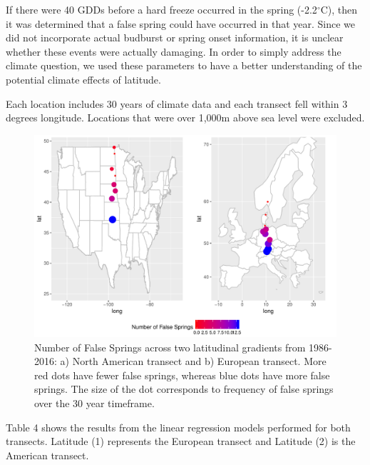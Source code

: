 \documentclass{article}\usepackage[]{graphicx}\usepackage[]{color}
\begin{document}
If there were 40 GDDs before a hard freeze occurred in the spring (-2.2$^{\circ}$C), then it was determined that a false spring could have occurred in that year. Since we did not incorporate actual budburst or spring onset information, it is unclear whether these events were actually damaging. In order to simply address the climate question, we used these parameters to have a better understanding of the potential climate effects of latitude. 

Each location includes 30 years of climate data and each transect fell within 3 degrees longitude. Locations that were over 1,000m above sea level were excluded. 

\begin{figure} [H]
\begin{center}
\caption{Number of False Springs across two latitudinal gradients from 1986-2016: a) North American transect and b) European transect. More red dots have fewer false springs, whereas blue dots have more false springs. The size of the dot corresponds to frequency of false springs over the 30 year timeframe. }
\includegraphics{..//figure/lat_maps.pdf}
\end{center}
\end{figure}

Table 4 shows the results from the linear regression models performed for both transects. Latitude (1) represents the European transect and Latitude (2) is the American transect. 
\end{document}
